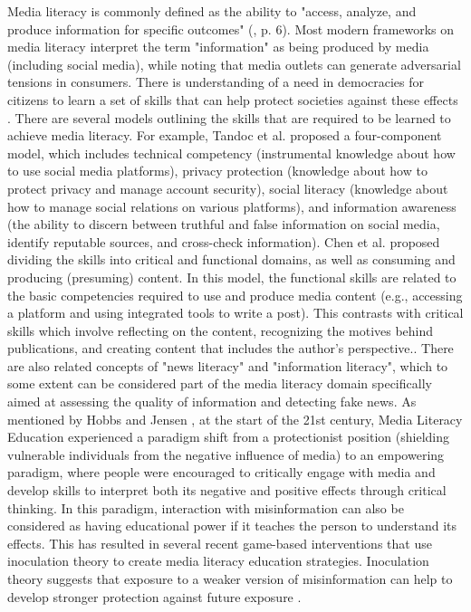 Media literacy is commonly defined as the ability to "access, analyze, and produce information for specific outcomes" (\cite{aufderheide2018media}, p. 6). Most modern frameworks on media literacy interpret the term "information" as being produced by media (including social media), while noting that media outlets can generate adversarial tensions in consumers. There is understanding of a need in democracies for citizens to learn a set of skills that can help protect societies against these effects \cite{potter2010state}. 
There are several models outlining the skills that are required to be learned to achieve media literacy. For example, Tandoc et al. proposed a four-component model, which includes technical competency (instrumental knowledge about how to use social media platforms), privacy protection (knowledge about how to protect privacy and manage account security), social literacy (knowledge about how to manage social relations on various platforms), and information awareness (the ability to discern between truthful and false information on social media, identify reputable sources, and cross-check information)\cite{tandoc2021developing}. Chen et al. proposed dividing the skills into critical and functional domains, as well as consuming and producing (presuming) content. In this model, the functional skills are related to the basic competencies required to use and produce media content (e.g., accessing a platform and using integrated tools to write a post). This contrasts with critical skills which involve reflecting on the content, recognizing the motives behind publications, and creating content that includes the author's perspective.\cite{chenwu2011unpacking}. There are also related concepts of "news literacy" \cite{malik2013challenges} and "information literacy"\cite{jones2021does}, which to some extent can be considered part of the media literacy domain specifically aimed at assessing the quality of information and detecting fake news.
As mentioned by Hobbs and Jensen \cite{hobbs2009past}, at the start of the 21st century, Media Literacy Education experienced a paradigm shift from a protectionist position (shielding vulnerable individuals from the negative influence of media) to an empowering paradigm, where people were encouraged to critically engage with media and develop skills to interpret both its negative and positive effects through critical thinking. In this paradigm, interaction with misinformation can also be considered as having educational power if it teaches the person to understand its effects. This has resulted in several recent game-based interventions that use inoculation theory to create media literacy education strategies. Inoculation theory suggests that exposure to a weaker version of misinformation can help to develop stronger protection against future exposure \cite{grace2023examining}.

